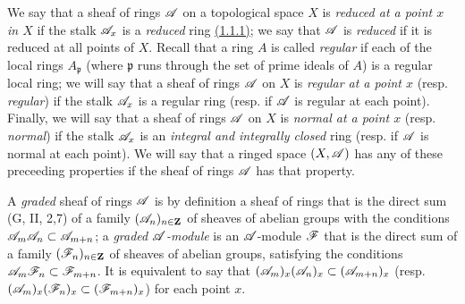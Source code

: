 \begin{env}[4.1.4]
\label{env-0.4.1.4}
We say that a sheaf of rings $\mathscr{A}$ on a topological space $X$ is
{\em reduced at a point $x$ in $X$} if the stalk $\mathscr{A}_x$ is a {\em reduced}
ring \hyperref[env-0.1.1.1]{(1.1.1)}; we say that $\mathscr{A}$ is {\em reduced} if it is reduced
at all points of $X$. Recall that a ring $A$ is called {\em regular} if each of
the local rings $A_\mathfrak{p}$ (where $\mathfrak{p}$ runs through the set of
prime ideals of $A$) is a regular local ring; we will say that a sheaf of rings
$\mathscr{A}$ on $X$ is {\em regular at a point $x$} (resp. {\em regular}) if the
stalk $\mathscr{A}_x$ is a regular ring (resp. if $\mathscr{A}$ is regular at each point).
Finally, we will say that a sheaf of rings $\mathscr{A}$ on $X$ is {\em normal at a
point $x$} (resp. {\em normal}) if the stalk $\mathscr{A}_x$ is an {\em integral
and integrally closed} ring (resp. if $\mathscr{A}$ is normal at each point). We will
say that a ringed space $(X,\mathscr{A})$ has any of these preceeding properties if
the sheaf of rings $\mathscr{A}$ has that property.

A {\em graded} sheaf of rings $\mathscr{A}$ is by definition a sheaf of rings that
is the direct sum (G, II, 2,7) of a family $(\mathscr{A}_n)_{n\in\mathbf{Z}}$ of sheaves
of abelian groups with the conditions $\mathscr{A}_m\mathscr{A}_n\subset\mathscr{A}_{m+n}$; a
{\em graded $\mathscr{A}$-module} is an $\mathscr{A}$-module $\mathscr{F}$ that is the direct
sum of a family $(\mathscr{F}_n)_{n\in\mathbf{Z}}$ of sheaves of abelian groups,
satisfying the conditions $\mathscr{A}_m\mathscr{F}_n\subset\mathscr{F}_{m+n}$. It is
equivalent to say that $(\mathscr{A}_m)_x(\mathscr{A}_n)_x\subset(\mathscr{A}_{m+n})_x$
(resp. $(\mathscr{A}_m)_x(\mathscr{F}_n)_x\subset(\mathscr{F}_{m+n})_x$) for each point $x$.
\end{env}

